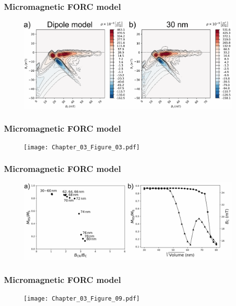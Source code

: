 \documentclass{beamer}
\begin{document}
        \begin{frame}
          \frametitle{Micromagnetic FORC model}
          \begin{figure}[htb]
            \centering
            \includegraphics[width=\textwidth]{Chapter_03_Figure_02.pdf}
          \end{figure}
        \end{frame}

        \begin{frame}
          \frametitle{Micromagnetic FORC model}
          \begin{figure}[htb]
            \centering
            \texttt{[image: Chapter\_03\_Figure\_03.pdf]}
          \end{figure}
        \end{frame}

        \begin{frame}
          \frametitle{Micromagnetic FORC model}
          \begin{figure}[htb]
            \centering
            \includegraphics[width=\textwidth]{Chapter_03_Figure_05.pdf}
          \end{figure}
        \end{frame}

        \begin{frame}
          \frametitle{Micromagnetic FORC model}
          \begin{figure}[htb]
            \centering
            \texttt{[image: Chapter\_03\_Figure\_09.pdf]}
          \end{figure}
        \end{frame}
\end{document}

